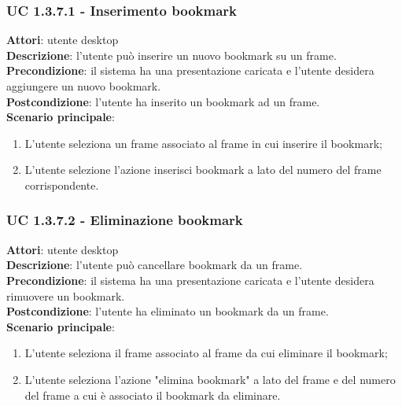\subsubsection{UC 1.3.7.1 - Inserimento bookmark}{
	\label{uc1.3.7.1}
	\textbf{Attori}: utente desktop \\
	\textbf{Descrizione}: l'utente può inserire un nuovo bookmark su un frame. \\
	\textbf{Precondizione}: il sistema ha una presentazione caricata e l'utente desidera aggiungere un nuovo bookmark.	\\
	\textbf{Postcondizione}: l'utente ha inserito un bookmark ad un frame.	\\
	\textbf{Scenario principale}:
	\begin{enumerate}
		\item L'utente seleziona un frame associato al frame in cui inserire il bookmark;
		\item L'utente selezione l'azione inserisci bookmark a lato del numero del frame corrispondente.
	\end{enumerate}
}
\subsubsection{UC 1.3.7.2 - Eliminazione bookmark}{
	\label{uc1.3.7.2}
	\textbf{Attori}: utente desktop \\
	\textbf{Descrizione}: l'utente può cancellare bookmark da un frame. \\
	\textbf{Precondizione}: il sistema ha una presentazione caricata e l'utente desidera rimuovere un bookmark.	\\
	\textbf{Postcondizione}: l'utente ha eliminato un bookmark da un frame.	\\
	\textbf{Scenario principale}:
	\begin{enumerate}
		\item L'utente seleziona il frame associato al frame da cui eliminare il bookmark;
		\item L'utente seleziona l'azione "elimina bookmark" a lato del frame e del numero del frame a cui è associato il bookmark da eliminare.
	\end{enumerate}
}
